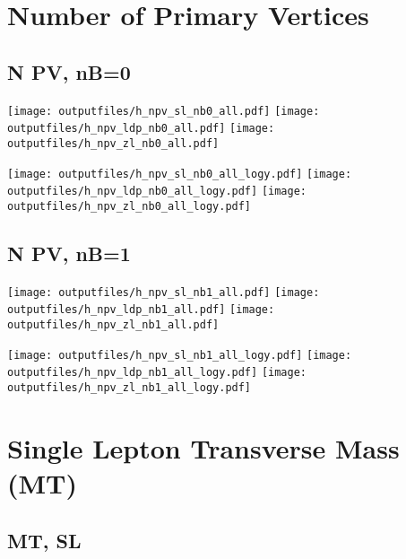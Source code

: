 \documentclass[11pt]{article}
\begin{document}
    \section{Number of Primary Vertices }

    \subsection{ N PV, nB=0 }

    \noindent
     \texttt{[image: outputfiles/h\_npv\_sl\_nb0\_all.pdf]}
     \texttt{[image: outputfiles/h\_npv\_ldp\_nb0\_all.pdf]}
     \texttt{[image: outputfiles/h\_npv\_zl\_nb0\_all.pdf]}

    \noindent
     \texttt{[image: outputfiles/h\_npv\_sl\_nb0\_all\_logy.pdf]}
     \texttt{[image: outputfiles/h\_npv\_ldp\_nb0\_all\_logy.pdf]}
     \texttt{[image: outputfiles/h\_npv\_zl\_nb0\_all\_logy.pdf]}




    \subsection{ N PV, nB=1 }

    \noindent
     \texttt{[image: outputfiles/h\_npv\_sl\_nb1\_all.pdf]}
     \texttt{[image: outputfiles/h\_npv\_ldp\_nb1\_all.pdf]}
     \texttt{[image: outputfiles/h\_npv\_zl\_nb1\_all.pdf]}

    \noindent
     \texttt{[image: outputfiles/h\_npv\_sl\_nb1\_all\_logy.pdf]}
     \texttt{[image: outputfiles/h\_npv\_ldp\_nb1\_all\_logy.pdf]}
     \texttt{[image: outputfiles/h\_npv\_zl\_nb1\_all\_logy.pdf]}



    \section{Single Lepton Transverse Mass (MT)}


    \subsection{ MT, SL }
\end{document}
